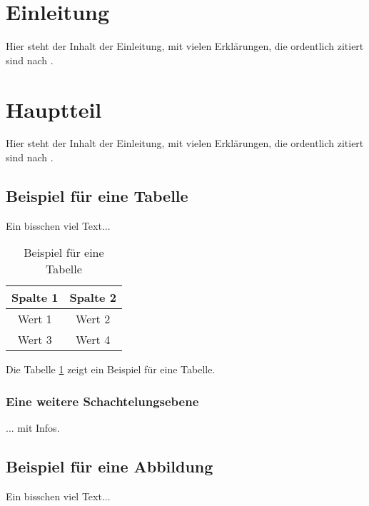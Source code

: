 \documentclass[12pt, a4paper, twoside]{article} %
\begin{document}
\newpage
\tableofcontents

\newpage
\listoffigures
\listoftables


\newpage
\section{Einleitung}
Hier steht der Inhalt der Einleitung, mit vielen Erklärungen, die ordentlich zitiert sind nach \cite[S. 25ff.]{example}.


\newpage
\section{Hauptteil}
Hier steht der Inhalt der Einleitung, mit vielen Erklärungen, die ordentlich zitiert sind nach \cite{bookexample}.


\subsection{Beispiel für eine Tabelle}

Ein bisschen viel Text... \lipsum[1]

\begin{table}[h]
\centering
\caption{Beispiel für eine Tabelle}
\label{tab:beispiel}
    \begin{tabular}{cc}
        \toprule
        Spalte 1 & Spalte 2 \\
        \midrule
        Wert 1 & Wert 2 \\
        Wert 3 & Wert 4 \\
        \bottomrule
    \end{tabular}
\end{table}

Die Tabelle \ref{tab:beispiel} zeigt ein Beispiel für eine Tabelle. \lipsum[1]


\subsubsection{Eine weitere Schachtelungsebene}
... mit Infos.


\subsection{Beispiel für eine Abbildung}
Ein bisschen viel Text... \lipsum[1] 
\end{document}
